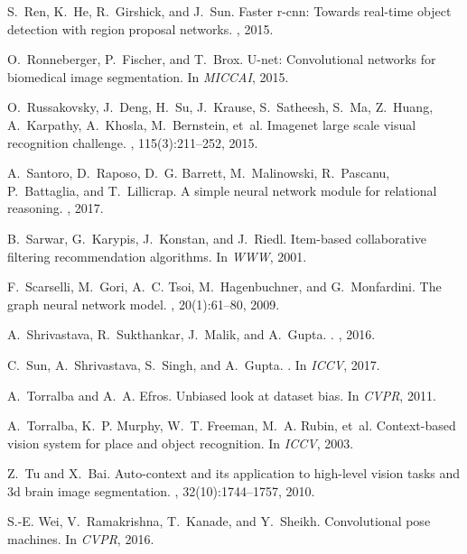 \documentclass[10pt,twocolumn,letterpaper]{article}
\begin{document}
{\begin{thebibliography}{10}
S.~Ren, K.~He, R.~Girshick, and J.~Sun.
\newblock Faster r-cnn: Towards real-time object detection with region proposal
  networks.
, 2015.

O.~Ronneberger, P.~Fischer, and T.~Brox.
\newblock U-net: Convolutional networks for biomedical image segmentation.
\newblock In {\em MICCAI}, 2015.

O.~Russakovsky, J.~Deng, H.~Su, J.~Krause, S.~Satheesh, S.~Ma, Z.~Huang,
  A.~Karpathy, A.~Khosla, M.~Bernstein, et~al.
\newblock Imagenet large scale visual recognition challenge.
, 115(3):211--252, 2015.

A.~Santoro, D.~Raposo, D.~G. Barrett, M.~Malinowski, R.~Pascanu, P.~Battaglia,
  and T.~Lillicrap.
\newblock A simple neural network module for relational reasoning.
, 2017.

B.~Sarwar, G.~Karypis, J.~Konstan, and J.~Riedl.
\newblock Item-based collaborative filtering recommendation algorithms.
\newblock In {\em WWW}, 2001.

F.~Scarselli, M.~Gori, A.~C. Tsoi, M.~Hagenbuchner, and G.~Monfardini.
\newblock The graph neural network model.
, 20(1):61--80, 2009.

A.~Shrivastava, R.~Sukthankar, J.~Malik, and A.~Gupta.
.
, 2016.

C.~Sun, A.~Shrivastava, S.~Singh, and A.~Gupta.
.
\newblock In {\em ICCV}, 2017.

A.~Torralba and A.~A. Efros.
\newblock Unbiased look at dataset bias.
\newblock In {\em CVPR}, 2011.

A.~Torralba, K.~P. Murphy, W.~T. Freeman, M.~A. Rubin, et~al.
\newblock Context-based vision system for place and object recognition.
\newblock In {\em ICCV}, 2003.

Z.~Tu and X.~Bai.
\newblock Auto-context and its application to high-level vision tasks and 3d
  brain image segmentation.
, 32(10):1744--1757, 2010.

S.-E. Wei, V.~Ramakrishna, T.~Kanade, and Y.~Sheikh.
\newblock Convolutional pose machines.
\newblock In {\em CVPR}, 2016.


\end{thebibliography}}
\end{document}
